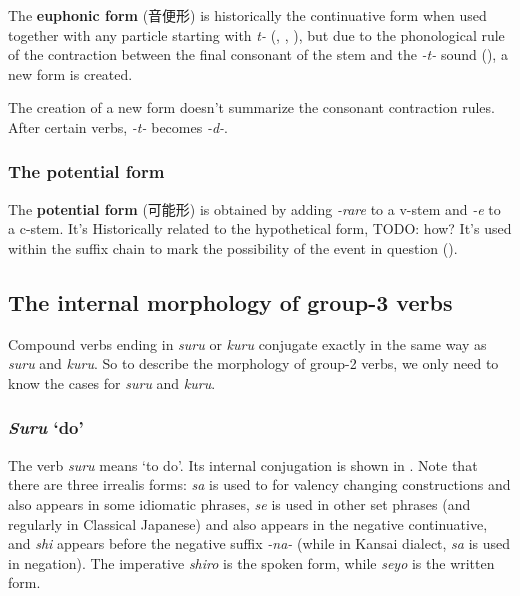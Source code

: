 \documentclass[UTF8, a4paper, oneside, scheme=plain]{ctexrep}
\newcommand*{\concept}[1]{\textbf{#1}}
\newcommand{\corpus}[1]{\emph{#1}}
\newcommand{\translate}[1]{`#1'}
\begin{document}
The \concept{euphonic form} (音便形) is 
historically the continuative form when used together with any particle starting with \corpus{t-}
(, , ),
but due to the phonological rule of the contraction 
between the final consonant of the stem and the \corpus{-t-} sound (),
a new form is created. 

The creation of a new form doesn't summarize the consonant contraction rules.
After certain verbs, \corpus{-t-} becomes \corpus{-d-}.

\subsubsection{The potential form}\label{sec:potential-form}

The \concept{potential form} (可能形) is obtained by adding \corpus{-rare} to a v-stem 
and \corpus{-e} to a c-stem.
It's Historically related to the hypothetical form, TODO: how?
It's used within the suffix chain to mark the possibility of the event in question 
().

\subsection{The internal morphology of group-3 verbs}

Compound verbs ending in \corpus{suru} or \corpus{kuru} conjugate exactly in the same way as 
\corpus{suru} and \corpus{kuru}.
So to describe the morphology of group-2 verbs,
we only need to know the cases for \corpus{suru} and \corpus{kuru}.

\subsubsection{\corpus{Suru} \translate{do}}

The verb \corpus{suru} means \translate{to do}. Its internal conjugation is shown in .
Note that there are three irrealis forms:
\corpus{sa} is used to for valency changing constructions and also appears in some idiomatic phrases,
\corpus{se} is used in other set phrases (and regularly in Classical Japanese) 
and also appears in the negative continuative,
and \corpus{shi} appears before the negative suffix \corpus{-na-}
(while in Kansai dialect, \corpus{sa} is used in negation).
The imperative \corpus{shiro} is the spoken form,
while \corpus{seyo} is the written form.
\end{document}
